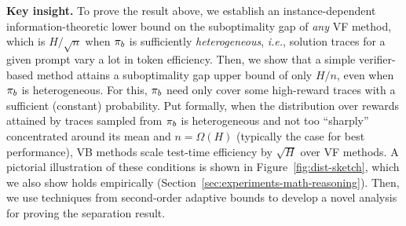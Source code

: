 \textbf{Key insight.} To prove the result above, we establish an instance-dependent information-theoretic lower bound on the suboptimality gap of \emph{any} VF method, which is $H / \sqrt{n}$ when $\pi_b$ is sufficiently \emph{heterogeneous}, \textit{i.e.},  solution traces for a given prompt vary a lot  in token efficiency.
Then, we show that a simple verifier-based method attains a suboptimality gap upper bound of only $H/n$, even when $\pi_b$ is heterogeneous. 
For this, $\pi_b$ need only cover some high-reward traces with a sufficient (constant) probability. 
Put formally, when the distribution over rewards  attained by traces sampled from $\pi_b$ is heterogeneous  and not too ``sharply'' concentrated around its mean and $n = \Omega(H)$ (typically the case for best performance), VB methods scale test-time efficiency by $\sqrt{H}$ over VF methods. A pictorial illustration of these conditions is shown in Figure~\ref{fig:dist-sketch}, which we also show holds empirically (Section~\ref{sec:experiments-math-reasoning}). 
Then, we use techniques from second-order adaptive bounds to develop a novel analysis for proving the separation result. 



































\vspace{-0.3cm}
